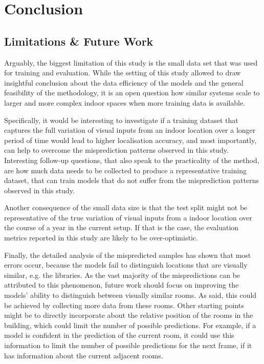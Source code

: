 \documentclass[a4paper]{article}
\begin{document}

\section{Conclusion}

\subsection{Limitations \& Future Work} %
\label{sub:limitations}


Arguably, the biggest limitation of this study is the small data set that was
used for training and evaluation. While the setting of this study allowed to
draw insightful conclusion about the data efficiency of the models and the
general feasibility of the methodology, it is an open question how similar
systems scale to larger and more complex indoor spaces when more training data
is available.

Specifically, it would be interesting to investigate if a training dataset that
captures the full variation of visual inputs from an indoor location over a
longer period of time would lead to higher localisation accuracy, and most
importantly, can help to overcome the misprediction patterns observed in this
study. Interesting follow-up questions, that also speak to the practicality of
the method, are how much data needs to be collected to produce a representative
training dataset, that can train models that do not suffer from the
misprediction patterns observed in this study.

Another consequence of the small data size is that the test split might not be
representative of the true variation of visual inputs from a indoor location
over the course of a year in the current setup. If that is the case, the
evaluation metrics reported in this study are likely to be over-optimistic.

Finally, the detailed analysis of the mispredicted samples has shown that most
errors occur, because the models fail to distinguish locations that are visually
similar, e.g. the libraries. As the vast majority of the mispredictions can be
attributed to this phenomenon, future work should focus on improving the models'
ability to distinguish between visually similar rooms. As said, this could be
achieved by collecting more data from these rooms. Other starting points might
be to directly incorporate about the relative position of the rooms in the
building, which could limit the number of possible predictions. For example, if
a model is confident in the prediction of the current room, it could use this
information to limit the number of possible predictions for the next frame, if
it has information about the current adjacent rooms.
\end{document}
